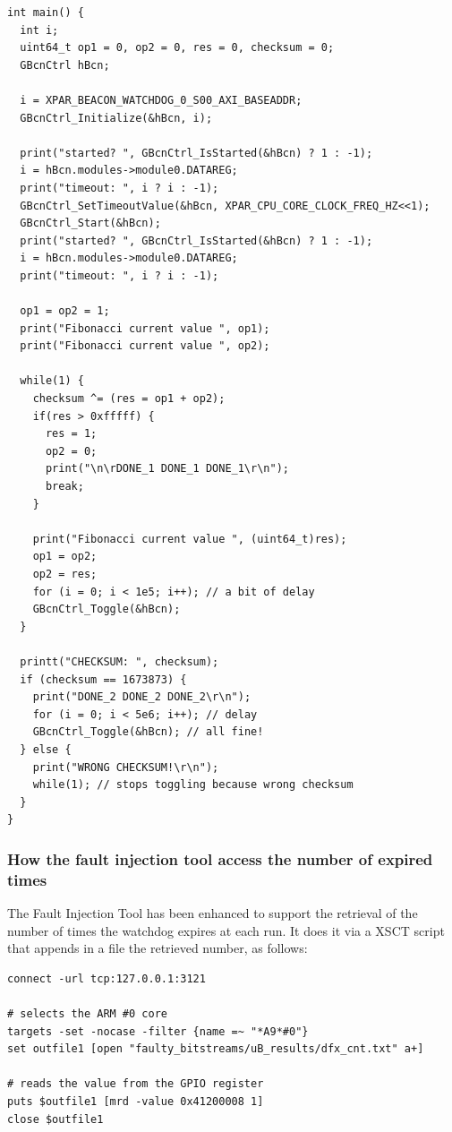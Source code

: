 \begin{lstlisting}[style=C]
int main() {
  int i;
  uint64_t op1 = 0, op2 = 0, res = 0, checksum = 0;
  GBcnCtrl hBcn;

  i = XPAR_BEACON_WATCHDOG_0_S00_AXI_BASEADDR;
  GBcnCtrl_Initialize(&hBcn, i);

  print("started? ", GBcnCtrl_IsStarted(&hBcn) ? 1 : -1);
  i = hBcn.modules->module0.DATAREG;
  print("timeout: ", i ? i : -1);
  GBcnCtrl_SetTimeoutValue(&hBcn, XPAR_CPU_CORE_CLOCK_FREQ_HZ<<1);
  GBcnCtrl_Start(&hBcn);
  print("started? ", GBcnCtrl_IsStarted(&hBcn) ? 1 : -1);
  i = hBcn.modules->module0.DATAREG;
  print("timeout: ", i ? i : -1);

  op1 = op2 = 1;
  print("Fibonacci current value ", op1);
  print("Fibonacci current value ", op2);

  while(1) {
    checksum ^= (res = op1 + op2);
    if(res > 0xfffff) {
  	  res = 1;
  	  op2 = 0;
  	  print("\n\rDONE_1 DONE_1 DONE_1\r\n");
  	  break;
    }

    print("Fibonacci current value ", (uint64_t)res);
    op1 = op2;
    op2 = res;
    for (i = 0; i < 1e5; i++); // a bit of delay
    GBcnCtrl_Toggle(&hBcn);
  }

  printt("CHECKSUM: ", checksum);
  if (checksum == 1673873) {
    print("DONE_2 DONE_2 DONE_2\r\n");
    for (i = 0; i < 5e6; i++); // delay
    GBcnCtrl_Toggle(&hBcn); // all fine!
  } else {
    print("WRONG CHECKSUM!\r\n");
    while(1); // stops toggling because wrong checksum
  }
}
\end{lstlisting}

\subsubsection{How the fault injection tool access the number of expired times}

The Fault Injection Tool has been enhanced to support the retrieval of the number of times the watchdog expires at each run. It does it via a XSCT script that appends in a file the retrieved number, as follows:\bigskip

\begin{lstlisting}[style=tcl]
connect -url tcp:127.0.0.1:3121

# selects the ARM #0 core
targets -set -nocase -filter {name =~ "*A9*#0"} 
set outfile1 [open "faulty_bitstreams/uB_results/dfx_cnt.txt" a+]    

# reads the value from the GPIO register
puts $outfile1 [mrd -value 0x41200008 1] 
close $outfile1
\end{lstlisting}

